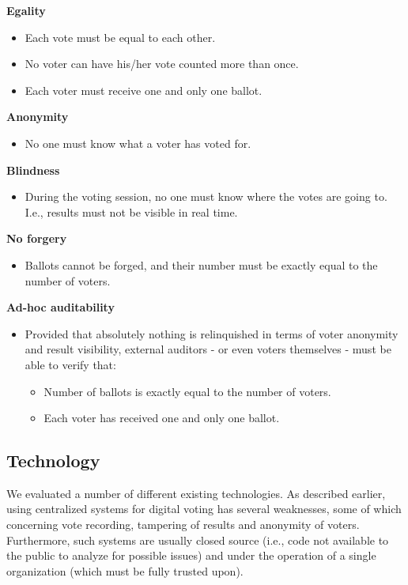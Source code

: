 \documentclass[10pt, letterpaper]{article}
\begin{document}
\textbf{Egality}
\begin{itemize}
\item Each vote must be equal to each other.
\item No voter can have his/her vote counted more than once.
\item Each voter must receive one and only one ballot.
\end{itemize}
\bigskip

\textbf{Anonymity}
\begin{itemize}
\item No one must know what a voter has voted for.
\end{itemize}
\bigskip

\textbf{Blindness}
\begin{itemize}
\item During the voting session, no one must know where the votes are going to. I.e., results must not be visible in real time.
\end{itemize}
\bigskip

\textbf{No forgery}
\begin{itemize}
\item Ballots cannot be forged, and their number must be exactly equal to the number of voters.
\end{itemize}
\bigskip

\textbf{Ad-hoc auditability}
\begin{itemize}
\item Provided that absolutely nothing is relinquished in terms of voter anonymity and result visibility, external auditors - or even voters themselves - must be able to verify that: 
\begin{itemize}
\item Number of ballots is exactly equal to the number of voters.
\item Each voter has received one and only one ballot.
\end{itemize}
\end{itemize}

\subsection{Technology}
We evaluated a number of different existing technologies. As described earlier, using centralized systems for digital voting has several weaknesses, some of which concerning vote recording, tampering of results and anonymity of voters. Furthermore, such systems are usually closed source (i.e., code not available to the public to analyze for possible issues) and under the operation of a single organization (which must be fully trusted upon).
\bigskip
\end{document}
